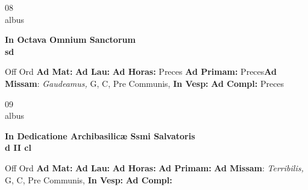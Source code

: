 \documentclass[10pt, openany]{book}
\begin{document}
    \begin{center}
        \begin{minipage}{3.5in}
            \vspace{2em}
            \begin{minipage}{0.5in}
                {\Huge 08} \\
                {\normalsize albus}
            \end{minipage}
            \begin{minipage}{3.0in}
                \textbf{ \large In Octava Omnium Sanctorum \\
                \textnormal{\normalsize sd}}

            \end{minipage}
            \begin{justify}Off Ord
                \textbf{Ad Mat: }
                \textbf{Ad Lau: }
                \textbf{Ad Horas: }Preces
                \textbf{Ad Primam: }Preces\textbf{Ad Missam}: \textit{Gaudeamus,} G, C, Pre Communis, 
                \textbf{In Vesp: }
                \textbf{Ad Compl: }Preces
            \end{justify}
        \end{minipage}
    \end{center}

    \begin{center}
        \begin{minipage}{3.5in}
            \vspace{2em}
            \begin{minipage}{0.5in}
                {\Huge 09} \\
                {\normalsize albus}
            \end{minipage}
            \begin{minipage}{3.0in}
                \textbf{ \large In Dedicatione Archibasilicæ Ssmi Salvatoris \\
                \textnormal{\normalsize d II cl}}

            \end{minipage}
            \begin{justify}Off Ord
                \textbf{Ad Mat: }
                \textbf{Ad Lau: }
                \textbf{Ad Horas: }
                \textbf{Ad Primam: }\textbf{Ad Missam}: \textit{Terribilis,} G, C, Pre Communis, 
                \textbf{In Vesp: }
                \textbf{Ad Compl: }
            \end{justify}
        \end{minipage}
    \end{center}
\end{document}

